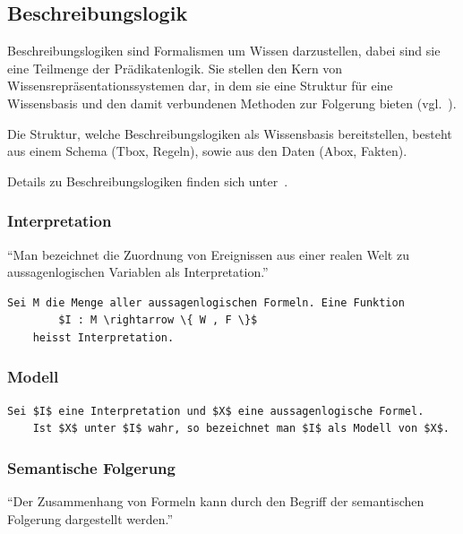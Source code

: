 \subsection{Beschreibungslogik}
\label{subsubsection:beschreibungslogik}
Beschreibungslogiken sind Formalismen um Wissen darzustellen, dabei sind sie eine Teilmenge der Prädikatenlogik. Sie stellen den Kern von Wissensrepräsentationssystemen dar, in dem sie eine Struktur für eine Wissensbasis und den damit verbundenen Methoden zur Folgerung bieten (vgl.~\cite{dl:baader2003}).

Die Struktur, welche Beschreibungslogiken als Wissensbasis bereitstellen, besteht aus einem Schema (Tbox, Regeln), sowie aus den Daten (Abox, Fakten).

Details zu Beschreibungslogiken finden sich unter~\cite{dl:baader2003}.

\subsubsection{Interpretation}
\label{subsubsection:beschreibungslogik_Interpretation}
``Man bezeichnet die Zuordnung von Ereignissen aus einer realen Welt zu aussagenlogischen Variablen als Interpretation.''~\cite[S. 36]{laemmel}

\begin{lstlisting}[caption={Definition einer Interpretation \protect\footnotemark}]
    Sei M die Menge aller aussagenlogischen Formeln. Eine Funktion
        $I : M \rightarrow \{ W , F \}$
    heisst Interpretation.
\end{lstlisting}

\subsubsection{Modell}
\label{subsubsection:beschreibungslogik_modell}
\begin{lstlisting}[caption={Definition Modell \protect\footnotemark}]
    Sei $I$ eine Interpretation und $X$ eine aussagenlogische Formel.
    Ist $X$ unter $I$ wahr, so bezeichnet man $I$ als Modell von $X$.
\end{lstlisting}

\subsubsection{Semantische Folgerung}
\label{subsubsection:beschreibungslogik_semfol}
``Der Zusammenhang von Formeln kann durch den Begriff der semantischen Folgerung dargestellt werden.''~\cite[S. 39]{laemmel}


